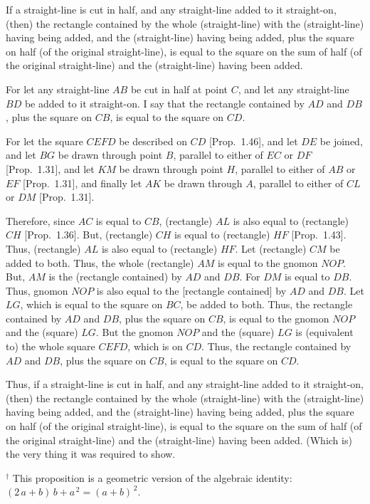 \begin{Parallel}{}{}
{If a straight-line is cut in half, and any straight-line added to it straight-on,
(then) the rectangle contained by the whole (straight-line) with the (straight-line) having being added, and the (straight-line) having being added,   plus the square on  half (of the original straight-line), is equal to the square on the
sum of  half  (of the original straight-line) and the (straight-line) having been added.

\epsfysize=1.8in
\centerline{}

For let any straight-line $AB$ be cut in half at point $C$, and let any
straight-line $BD$ be added to it straight-on. I say that the rectangle
contained by $AD$ and $DB$, plus the square on $CB$, is equal to the square on
$CD$.

For let the square $CEFD$ be described on $CD$ [Prop.~1.46], and let $DE$ be
joined, and let $BG$ be drawn through point $B$, parallel to either of $EC$
or $DF$ [Prop.~1.31], and let $KM$ be drawn through point $H$, parallel
to either of $AB$ or $EF$ [Prop.~1.31], and finally let $AK$ be drawn
through $A$, parallel to either of $CL$ or $DM$ [Prop.~1.31].

Therefore, since $AC$ is equal to $CB$, (rectangle) $AL$ is also equal to (rectangle) $CH$ [Prop.~1.36]. But, (rectangle) $CH$ is equal to (rectangle) $HF$ [Prop.~1.43]. Thus, (rectangle) $AL$ is also equal to (rectangle) $HF$. Let (rectangle) $CM$ 
be  added to both. Thus, the whole (rectangle) $AM$ is equal to the gnomon $NOP$.
But, $AM$ is  the (rectangle contained) by $AD$ and $DB$. For
$DM$ is equal to $DB$. Thus, gnomon $NOP$ is also equal to the
[rectangle contained] by $AD$ and $DB$.
Let $LG$, which is equal to the square on $BC$, be added to both.
Thus, the rectangle contained by $AD$ and $DB$, plus the square on $CB$, is equal
to the gnomon $NOP$ and the (square) $LG$. But the gnomon $NOP$ and 
the (square) $LG$ is (equivalent to) the whole square $CEFD$, which is on  $CD$. Thus, the rectangle
contained by $AD$ and $DB$, plus the square on $CB$, is equal to the square on $CD$.

Thus, if a straight-line is cut in half, and any straight-line added to it straight-on,
(then) the rectangle contained by the whole (straight-line) with the (straight-line) having being added, and the (straight-line) having being added,   plus the square on  half (of the original straight-line), is equal to the square on the
sum of  half  (of the original straight-line) and the (straight-line) having been added. (Which is) the very thing it was required to show.}
\end{Parallel}
{\footnotesize \noindent$^\dag$ This proposition is a geometric version
of the algebraic identity: $(2\,a+b)\,b + a^{\,2} = (a+b)^{\,2}$.}

